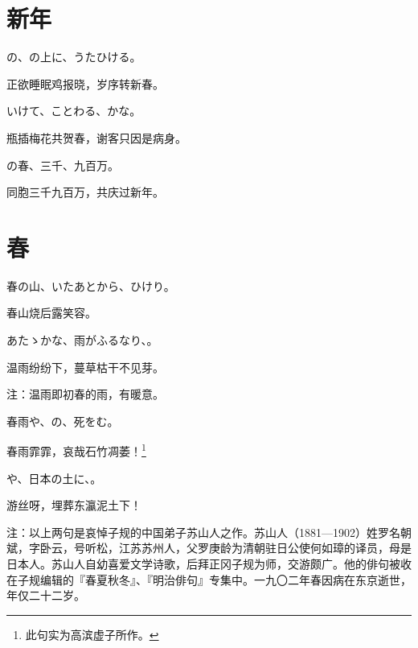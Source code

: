 \newpage

\section{\FK 新年}

\setcounter{haikucounter}{0}

\begin{haiku}
    {\FH {}の、の上に、うたひける。}

    {\FK 正欲睡眠鸡报晓，岁序转新春。}
\end{haiku}

\begin{haiku}
    {\FH {}いけて、ことわる、かな。}

    {\FK 瓶插梅花共贺春，谢客只因是病身。}
\end{haiku}

\begin{haiku}
    {\FH {}の春、三千、九百万。}

    {\FK 同胞三千九百万，共庆过新年。}
\end{haiku}

\section{\FK 春}

\setcounter{haikucounter}{0}

\begin{haiku}
    {\FH 春の山、いたあとから、ひけり。}

    {\FK 春山烧后露笑容。}
\end{haiku}

\begin{haiku}
    {\FH あたゝかな、雨がふるなり、。}

    {\FK 温雨纷纷下，蔓草枯干不见芽。}

    {\FT 注：温雨即初春的雨，有暖意。}
\end{haiku}

\begin{haiku}
    {\FH 春雨や、の、死をむ。}

    {\FK 春雨霏霏，哀哉石竹凋萎！\footnote{\FT 此句实为高滨虚子所作。}}
\end{haiku}

\begin{haiku}
    {\FH {}や、日本の土に、。}

    {\FK 游丝呀，埋葬东瀛泥土下！}

    {\FT 注：以上两句是哀悼子规的中国弟子苏山人之作。苏山人（1881—1902）姓罗名朝斌，字卧云，号听松，江苏苏州人，父罗庚龄为清朝驻日公使何如璋的译员，母是日本人。苏山人自幼喜爱文学诗歌，后拜正冈子规为师，交游颇广。他的俳句被收在子规编辑的『春夏秋冬』、『明治俳句』专集中。一九〇二年春因病在东京逝世，年仅二十二岁。}
\end{haiku}


